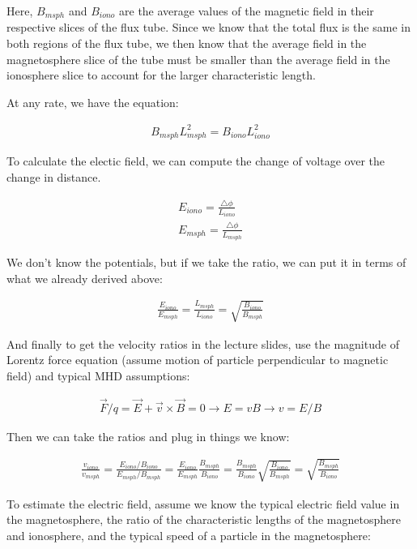 Here, $B_{msph}$ and $B_{iono}$ are the average values of the magnetic
field in their respective slices of the flux tube. Since we know that
the total flux is the same in both regions of the flux tube, we then
know that the average field in the magnetosphere slice of the tube must
be smaller than the average field in the ionosphere slice to account for
the larger characteristic length. 

At any rate, we have the equation:

\begin{gather*}
  B_{msph}L_{msph}^{2} = B_{iono}L_{iono}^{2}
\end{gather*}

To calculate the electic field, we can compute the change of voltage
over the change in distance.

\begin{gather*}
  E_{iono} = \frac{\bigtriangleup \phi}{L_{iono}}\\
  E_{msph} = \frac{\bigtriangleup \phi}{L_{msph}}
\end{gather*}

We don't know the potentials, but if we take the ratio, we can put it in
terms of what we already derived above:

\begin{gather*}
  \frac{E_{iono}}{E_{msph}} = \frac{L_{msph}}{L_{iono}} =
  \sqrt{\frac{B_{iono}}{B_{msph}}}
\end{gather*}

And finally to get the velocity ratios in the lecture slides, use the
magnitude of Lorentz force equation (assume motion of particle
perpendicular to magnetic field) and typical MHD assumptions:

\begin{gather*}
  \vec{F}/q = \vec{E} + \vec{v}\times\vec{B} = 0
  \rightarrow E = vB
  \rightarrow v = E/B
\end{gather*}

Then we can take the ratios and plug in things we know:

\begin{gather*}
  \frac{v_{iono}}{v_{msph}} =
  \frac{E_{iono}/B_{iono}}{E_{msph}/B_{msph}} =
  \frac{E_{iono}}{E_{msph}}\frac{B_{msph}}{B_{iono}} =
  \frac{B_{msph}}{B_{iono}}\sqrt{\frac{B_{iono}}{B_{msph}}} =
  \sqrt{\frac{B_{msph}}{B_{iono}}}
\end{gather*}

To estimate the electric field, assume we know the typical electric
field value in the magnetosphere, the ratio of the characteristic
lengths of the magnetosphere and ionosphere, and the typical speed of a
particle in the magnetosphere:

